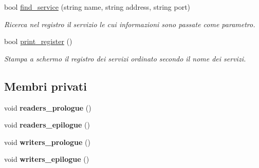 \begin{DoxyCompactItemize}
bool \hyperlink{class_service__register_adf027594b08fe6fea2e554bf4b17053c}{find\-\_\-service} (string name, string address, string port)
\begin{DoxyCompactList}\small\item\em Ricerca nel registro il servizio le cui informazioni sono passate come parametro. \end{DoxyCompactList}\item 
bool \hyperlink{class_service__register_aaf0f7e8d09c289bd94d9f90774836d15}{print\-\_\-register} ()
\begin{DoxyCompactList}\small\item\em Stampa a schermo il registro dei servizi ordinato secondo il nome dei servizi. \end{DoxyCompactList}\end{DoxyCompactItemize}
\subsection*{Membri privati}
\begin{DoxyCompactItemize}
\item 
\hypertarget{class_service__register_ae6797428e100cd11445045c758776068}{void {\bfseries readers\-\_\-prologue} ()}\label{class_service__register_ae6797428e100cd11445045c758776068}

\item 
\hypertarget{class_service__register_ae669771d699cb3e0f22bee094a9bcf91}{void {\bfseries readers\-\_\-epilogue} ()}\label{class_service__register_ae669771d699cb3e0f22bee094a9bcf91}

\item 
\hypertarget{class_service__register_ace8e28500462659c4bbadfca9e492a96}{void {\bfseries writers\-\_\-prologue} ()}\label{class_service__register_ace8e28500462659c4bbadfca9e492a96}

\item 
\hypertarget{class_service__register_a9f89952581ecc0cb3f97a662abefef37}{void {\bfseries writers\-\_\-epilogue} ()}\label{class_service__register_a9f89952581ecc0cb3f97a662abefef37}

\end{DoxyCompactItemize}
